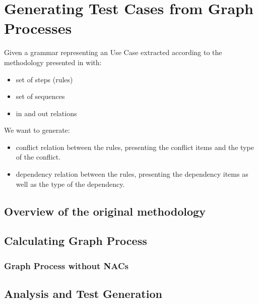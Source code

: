 \chapter{Generating Test Cases from Graph Processes}

Given a grammar representing an Use Case extracted according to the methodology presented in \cite{Junior2015} with:

\begin{itemize}
\item set of steps (rules)
\item set of sequences
\item in and out relations
\end{itemize}

We want to generate:

\begin{itemize}
\item conflict relation between the rules, presenting the conflict items and the type of the conflict.
\item dependency relation between the rules, presenting the dependency items as well as the type of the dependency.
\end{itemize}

\section{Overview of the original methodology}

\section{Calculating Graph Process}

\subsection{Graph Process without NACs}

\begin{definition}
\end{definition}

\section{Analysis and Test Generation}





